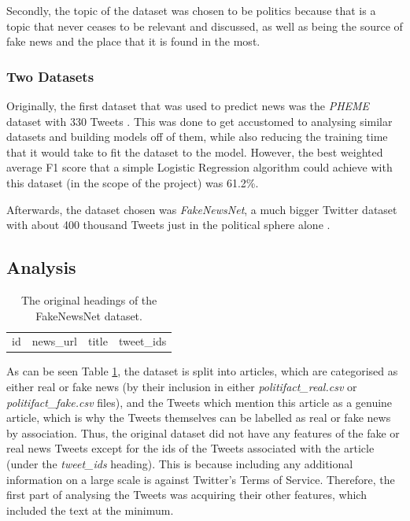 \documentclass{l4proj}
\begin{document}
Secondly, the topic of the dataset was chosen to be politics because that is a topic that never ceases to be relevant and discussed, as well as being the source of fake news and the place that it is found in the most.

\subsubsection{Two Datasets}

Originally, the first dataset that was used to predict news was the \textit{PHEME} dataset with 330 Tweets \citep{PHEME}. This was done to get accustomed to analysing similar datasets and building models off of them, while also reducing the training time that it would take to fit the dataset to the model. However, the best weighted average F1 score that a simple Logistic Regression algorithm could achieve with this dataset (in the scope of the project) was 61.2\%.

Afterwards, the dataset chosen was \textit{FakeNewsNet}, a much bigger Twitter dataset with about 400 thousand Tweets just in the political sphere alone \citep{FakeNewsNet}.

\subsection{Analysis}
\label{subsec:dataset_anal}

\begin{table}
    \caption{The original headings of the {\normalfont FakeNewsNet} dataset.}
    \label{tab:og_headings}
    \begin{tabular}{llll}
        id & news\_url & title & tweet\_ids
    \end{tabular}
\end{table}

As can be seen Table \ref{tab:og_headings}, the dataset is split into articles, which are categorised as either real or fake news (by their inclusion in either \textit{politifact\_real.csv} or \textit{politifact\_fake.csv} files), and the Tweets which mention this article as a genuine article, which is why the Tweets themselves can be labelled as real or fake news by association. Thus, the original dataset did not have any features of the fake or real news Tweets except for the ids of the Tweets associated with the article (under the \textit{tweet\_ids} heading). This is because including any additional information on a large scale is against Twitter's Terms of Service. Therefore, the first part of analysing the Tweets was acquiring their other features, which included the text at the minimum. 
\end{document}
